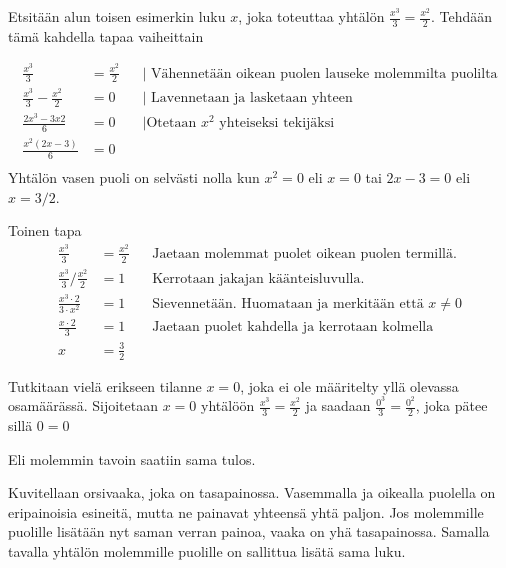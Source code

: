 \begin{esimerkki}
Etsitään alun toisen esimerkin luku $x$, joka toteuttaa yhtälön $\frac{x^3}{3}=\frac{x^2}{2}$. Tehdään tämä kahdella tapaa vaiheittain

		\begin{align*}
			\frac{x^3}{3}&=\frac{x^2}{2} && \text{| Vähennetään oikean puolen lauseke molemmilta puolilta} \\
			\frac{x^3}{3}-\frac{x^2}{2}&=0  && \text{| Lavennetaan ja lasketaan yhteen} \\
			\frac{2x^3-3x2}{6}&=0 && \text{|Otetaan $x^2$ yhteiseksi tekijäksi} \\
			\frac{x^2(2x-3)}{6}&=0 && \\
		\end{align*}
Yhtälön vasen puoli on selvästi nolla kun $x^2=0$ eli $x=0$ tai $2x-3=0$ eli $x=3/2$. 

Toinen tapa
\begin{align*}
\frac{x^3}{3}&=\frac{x^2}{2} && \text{Jaetaan molemmat puolet oikean puolen termillä. } \\
\frac{x^3}{3}/\frac{x^2}{2}&=1 && \text{Kerrotaan jakajan käänteisluvulla.} \\
\frac{x^3\cdot2}{3\cdot x^2}&=1 && \text{Sievennetään. Huomataan ja merkitään että $x\neq0$} \\
\frac{x\cdot2}{3}&=1 && \text{Jaetaan puolet kahdella ja kerrotaan kolmella} \\
x&=\frac{3}{2}
\end{align*}

Tutkitaan vielä erikseen tilanne $x=0$, joka ei ole määritelty yllä olevassa osamäärässä. Sijoitetaan $x=0$ yhtälöön $\frac{x^3}{3}=\frac{x^2}{2}$ ja saadaan $\frac{0^3}{3}=\frac{0^2}{2}$, joka pätee sillä $0=0$ 

Eli molemmin tavoin saatiin sama tulos.



\end{esimerkki}

\begin{esimerkki}
	Kuvitellaan orsivaaka, joka on tasapainossa. Vasemmalla ja oikealla puolella on eripainoisia esineitä, mutta ne painavat yhteensä yhtä paljon. Jos molemmille puolille lisätään nyt saman verran painoa, vaaka on yhä tasapainossa. Samalla tavalla yhtälön molemmille puolille on sallittua lisätä sama luku.
\end{esimerkki}

